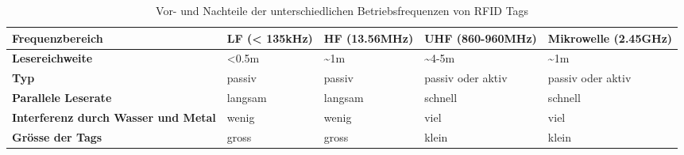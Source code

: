 \begin{table}[htb]
	\begin{tabularx}{\textwidth}{|X|X|X|X|X|}
		\hline
		\textbf{Frequenz\-bereich} & \textbf{LF (< 135kHz)} & \textbf{HF (13.56MHz)} & \textbf{UHF (860-960MHz)} & \textbf{Mikrowelle (2.45GHz)}\\
		\hline
		\textbf{Lesereichweite} & <0.5m & \textasciitilde 1m & \textasciitilde 4-5m & \textasciitilde 1m\\
		\hline
		\textbf{Typ} & passiv & passiv & passiv oder aktiv & passiv oder aktiv\\
		\hline
		\textbf{Parallele Leserate} & langsam & langsam & schnell & schnell \\
		\hline
		\textbf{Interferenz durch Wasser und Metal} & wenig & wenig & viel & viel \\
		\hline
		\textbf{Grösse der Tags} & gross & gross & klein & klein \\
		\hline
	\end{tabularx}
	\caption{Vor- und Nachteile der unterschiedlichen Betriebsfrequenzen von \gls{RFID} Tags \parencite{chawla2007}}
	\label{tbl:RFIDFrequencies}
\end{table}
